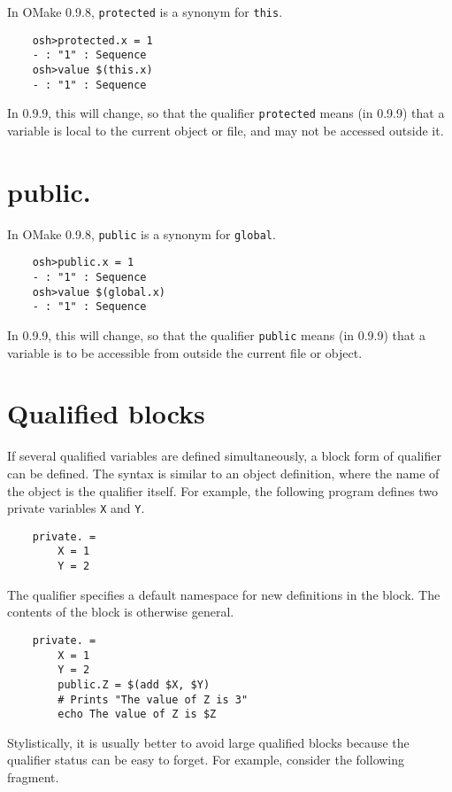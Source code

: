 In OMake 0.9.8, \verb+protected+ is a synonym for \verb+this+.

\begin{verbatim}
    osh>protected.x = 1
    - : "1" : Sequence
    osh>value $(this.x)
    - : "1" : Sequence
\end{verbatim}
%
In 0.9.9, this will change, so that the qualifier \verb+protected+ means (in 0.9.9) that a variable
is local to the current object or file, and may not be accessed outside it.

\section{public.}
\label{section:public}

In OMake 0.9.8, \verb+public+ is a synonym for \verb+global+.

\begin{verbatim}
    osh>public.x = 1
    - : "1" : Sequence
    osh>value $(global.x)
    - : "1" : Sequence
\end{verbatim}
%
In 0.9.9, this will change, so that the qualifier \verb+public+ means (in 0.9.9) that a variable
is to be accessible from outside the current file or object.

\section{Qualified blocks}

If several qualified variables are defined simultaneously, a block form of qualifier can be defined.
The syntax is similar to an object definition, where the name of the object is the qualifier itself.
For example, the following program defines two private variables \verb+X+ and \verb+Y+.

\begin{verbatim}
    private. =
        X = 1
        Y = 2
\end{verbatim}
%
The qualifier specifies a default namespace for new definitions in the block.  The contents of the
block is otherwise general.

\begin{verbatim}
    private. =
        X = 1
        Y = 2
        public.Z = $(add $X, $Y)
        # Prints "The value of Z is 3"
        echo The value of Z is $Z
\end{verbatim}
%
Stylistically, it is usually better to avoid large qualified blocks because the qualifier status can
be easy to forget.  For example, consider the following fragment.

